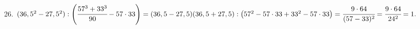 26. $(36,5^2-27,5^2):\left(\cfrac{57^3+33^3}{90}-57\cdot 33 \right)=
(36,5-27,5)(36,5+27,5):\left(57^2-57\cdot33+33^2-57\cdot 33 \right)=\cfrac{9\cdot64}{(57-33)^2}=\cfrac{9\cdot64}{24^2}=1.$\\
